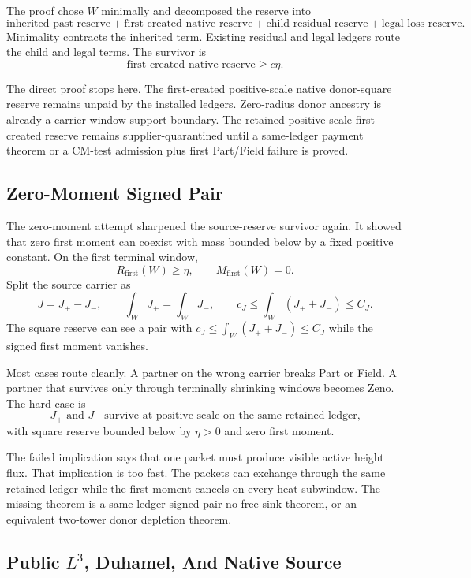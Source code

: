 The proof chose \(W\) minimally and decomposed the reserve into
\[
  \text{inherited past reserve}
  +\text{first-created native reserve}
  +\text{child residual reserve}
  +\text{legal loss reserve}.
\]
Minimality contracts the inherited term.
Existing residual and legal ledgers route the child and legal terms.
The survivor is
\[
  \text{first-created native reserve}\ge c\eta .
\]

The direct proof stops here.
The first-created positive-scale native donor-square reserve remains unpaid by
the installed ledgers.
Zero-radius donor ancestry is already a carrier-window support boundary.
The retained positive-scale first-created reserve remains supplier-quarantined
until a same-ledger payment theorem or a CM-test admission plus first Part/Field
failure is proved.

\subsection{Zero-Moment Signed Pair}

The zero-moment attempt sharpened the source-reserve survivor again.
It showed that zero first moment can coexist with mass bounded below by a fixed
positive constant.
On the first terminal window,
\[
  R_{\mathrm{first}}(W)\ge\eta,
  \qquad
  M_{\mathrm{first}}(W)=0 .
\]
Split the source carrier as
\[
  J=J_+-J_-,
  \qquad
  \int_WJ_+=\int_WJ_-,
  \qquad
  c_J\le \int_W(J_++J_-)\le C_J .
\]
The square reserve can see a pair with
\(c_J\le \int_W(J_++J_-)\le C_J\) while the signed first moment
vanishes.

Most cases route cleanly.
A partner on the wrong carrier breaks Part or Field.
A partner that survives only through terminally shrinking windows becomes Zeno.
The hard case is
\[
  J_+\text{ and }J_-
  \text{ survive at positive scale on the same retained ledger,}
\]
with square reserve bounded below by \(\eta>0\) and zero first moment.

The failed implication says that one packet must produce visible active height flux.
That implication is too fast.
The packets can exchange through the same retained ledger while the first
moment cancels on every heat subwindow.
The missing theorem is a same-ledger signed-pair no-free-sink theorem, or an
equivalent two-tower donor depletion theorem.

\subsection{Public \(L^3\), Duhamel, And Native Source}

